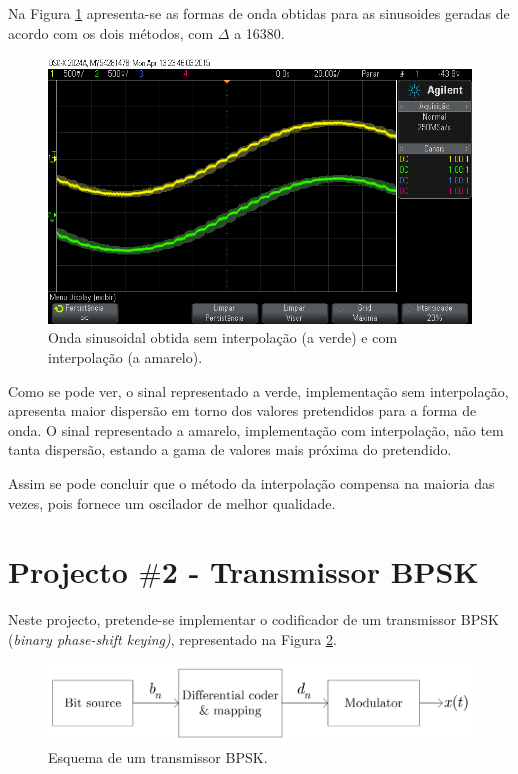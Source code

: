 \documentclass[11pt]{article}
\numberwithin{equation}{section}
\begin{document}
Na Figura \ref{fig:AE1} apresenta-se as formas de onda obtidas para as sinusoides geradas de acordo com os dois métodos, com $\Delta$ a 16380.

\begin{figure}[H]
	\centering
	\includegraphics[keepaspectratio=true, scale=0.33]{exps/diferenca1}
	\caption{Onda sinusoidal obtida sem interpolação (a verde) e com interpolação (a amarelo).}
	\vspace{-0.8em}
	\label{fig:AE1}
\end{figure}

Como se pode ver, o sinal representado a verde, implementação sem interpolação, apresenta maior dispersão em torno dos valores pretendidos para a forma de onda. O sinal representado a amarelo, implementação com interpolação, não tem tanta dispersão, estando a gama de valores mais próxima do pretendido. 

Assim se pode concluir que o método da interpolação compensa na maioria das vezes, pois fornece um oscilador de melhor qualidade.

\pagebreak

\section{Projecto $\#$2 - Transmissor BPSK}

Neste projecto, pretende-se implementar o codificador de um transmissor BPSK (\textit{binary phase-shift keying)}, representado na Figura \ref{fig:BPSK}.

\begin{figure}[H]
	\centering
	\includegraphics[keepaspectratio=true, scale=0.5]{teoricas/bpsk}
	\caption{Esquema de um transmissor BPSK.}
	\vspace{-0.8em}
	\label{fig:BPSK}
\end{figure}
\end{document}
